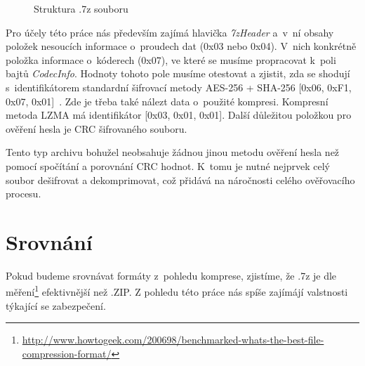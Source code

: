 \begin{figure}[ht]
    \begin{center}
    \end{center}
    \caption{Struktura .7z souboru \cite{Pavlov:2015}}
    \label{7zstruct}
\end{figure}
Pro účely této práce nás především zajímá hlavička {\it 7zHeader} a~v~ní obsahy položek nesoucích
informace o~proudech dat (0x03 nebo 0x04). V~nich konkrétně položka informace o~kóderech (0x07),
ve které se musíme propracovat k~poli bajtů {\it CodecInfo}. Hodnoty tohoto pole musíme otestovat
a zjistit, zda se shodují s~identifikátorem standardní šifrovací metody AES-256 + SHA-256
[0x06, 0xF1, 0x07, 0x01]~\cite{Pavlov:2015}. Zde je třeba také nálezt data o~použité kompresi.
Kompresní metoda LZMA má identifikátor [0x03, 0x01, 0x01]. Další důležitou položkou pro ověření
hesla je CRC šifrovaného souboru.

Tento typ archivu bohužel neobsahuje žádnou jinou metodu ověření hesla než pomocí spočítání a
porovnání CRC hodnot. K~tomu je nutné nejprvek celý soubor dešifrovat a dekomprimovat, což přidává
na náročnosti celého ověřovacího procesu.

\section{Srovnání}
Pokud budeme srovnávat formáty z~pohledu komprese, zjistíme, že .7z je dle
měření\footnote{\url{http://www.howtogeek.com/200698/benchmarked-whats-the-best-file-compression-format/}}
efektivnější než .ZIP. Z pohledu této práce nás spíše zajímájí valstnosti týkající se zabezpečení.

